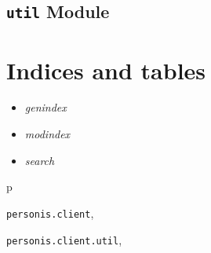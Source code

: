 \documentclass[letterpaper,10pt,english]{sphinxmanual}
\begin{document}
\section{\texttt{util} Module}
\label{personis.client:util-module}\label{personis.client:module-personis.client.util}

\chapter{Indices and tables}
\label{index:indices-and-tables}\begin{itemize}
\item {} 
\emph{genindex}

\item {} 
\emph{modindex}

\item {} 
\emph{search}

\end{itemize}


\renewcommand{\indexname}{Python Module Index}
\begin{theindex}
\def\bigletter#1{{\Large\sffamily#1}\nopagebreak\vspace{1mm}}
\bigletter{p}
\item {\texttt{personis.client}}, \pageref{personis.client:module-personis.client}
\item {\texttt{personis.client.util}}, \pageref{personis.client:module-personis.client.util}
\end{theindex}

\renewcommand{\indexname}{Index}
\printindex
\end{document}
